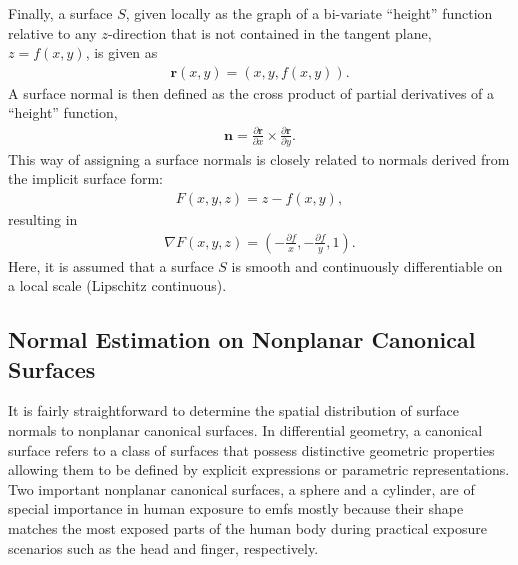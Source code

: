 Finally, a surface $S$, given locally as the graph of a bi-variate ``height'' function relative to any $z$-direction that is not contained in the tangent plane, $z = f(x, y)$, is given as
\begin{align}
    \mathbf{r}(x, y) = \left( x, y, f(x, y) \right).
\end{align}
A surface normal is then defined as the cross product of partial derivatives of a ``height'' function,
\begin{align}
    \mathbf{n} = \frac{\partial \mathbf{r}}{\partial x} \times \frac{\partial \mathbf{r}}{\partial y}.
\end{align}
This way of assigning a surface normals is closely related to normals derived from the implicit surface form:
\begin{align}
    F(x, y, z) = z - f(x, y),
\end{align}
resulting in
\begin{align}
    \nabla F(x, y, z) = \left( -\frac{\partial f}{x}, -\frac{\partial f}{y}, 1 \right).
\end{align}
Here, it is assumed that a surface $S$ is smooth and continuously differentiable on a local scale (Lipschitz continuous).

\subsection{Normal Estimation on Nonplanar Canonical Surfaces}
It is fairly straightforward to determine the spatial distribution of surface normals to nonplanar canonical surfaces.
In differential geometry, a canonical surface refers to a class of surfaces that possess distinctive geometric properties allowing them to be defined by explicit expressions or parametric representations.
Two important nonplanar canonical surfaces, a sphere and a cylinder, are of special importance in human exposure to \gls{emf}s mostly because their shape matches the most exposed parts of the human body during practical exposure scenarios such as the head and finger, respectively.

